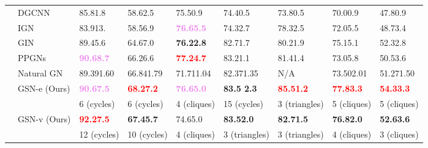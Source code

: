 \documentclass{article} \usepackage{iclr2021_conference,times}
\begin{document}
\begin{table}[t]
{\begin{tabular}{p{0.01cm}l|llll|lll}
        & DGCNN \citep{zhang2018end} & 85.81.8 & 
        58.62.5 & 
        75.50.9 & 
        74.40.5 & 
        73.80.5 &
        70.00.9 & 
        47.80.9\\
        

        
        &IGN \citep{DBLP:conf/iclr/MaronBSL19} & 83.913. &
        58.56.9 &
        \textbf{\textcolor{violet}{76.65.5}} &
        74.32.7 & 
        78.32.5 & 
        72.05.5 & 
        48.73.4\\
        
        &GIN \citep{xu2018how} & 
        89.45.6 & 
        64.67.0	& 
        \textbf{76.22.8} &
        82.71.7 &
        80.21.9 & 
        75.15.1 & 
        52.32.8\\
        

        
        &PPGNs \citep{maron2019provably} &
        \textbf{\textcolor{violet}{90.68.7}} &
        66.26.6 &
        \textbf{\textcolor{red}{77.24.7}} & 
        83.21.1 & 
        81.41.4 &
        73.05.8 & 
        50.53.6\\
        
        &Natural GN \citep{de2020natural} &
        89.391.60 &
        66.841.79 &
        71.711.04 &
        82.371.35 &
        N/A &
        73.502.01 &
        51.271.50 \\
        
        \hline
        &GSN-e (Ours) & \textbf{\textcolor{violet}{90.67.5}}  &
        \textbf{\textcolor{red}{68.27.2}}& 
        \textbf{\textcolor{violet}{76.65.0}}& 
        \textbf{83.5 2.3}&
        \textbf{\textcolor{red}{85.51.2}} &
        \textbf{\textcolor{red}{77.83.3}} & 
        \textbf{\textcolor{red}{54.33.3}}\\
       &  &  6 (cycles)  & 6 (cycles)  & 4 (cliques) & 15 (cycles) & 3 (triangles) & 5 (cliques)    & 5 (cliques)   \\
        \hline
        &GSN-v (Ours) &
        \textbf{\textcolor{red}{92.27.5}} & 
        \textbf{67.45.7} & 
        74.65.0 &
        \textbf{ 83.52.0} &
        \textbf{82.71.5}  &
        \textbf{{76.82.0}}&
        \textbf{52.63.6}\\
        &    &  12 (cycles)   &  10 (cycles)    &  4 (cliques) & 3 (triangles) & 3 (triangles) &   4 (cliques) &   3 (cliques) \\
\end{tabular}}
\end{table}
\end{document}

